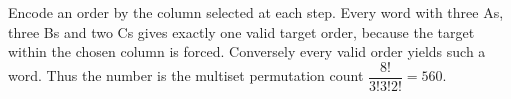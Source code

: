 Encode an order by the column selected at each step. Every word with three A\textquotesingle s, three B\textquotesingle s and two C\textquotesingle s gives exactly one valid target order, because the target within the chosen column is forced. Conversely every valid order yields such a word. Thus the number is the multiset permutation count $\boxed{\dfrac{8!}{3!3!2!}=560}$.
